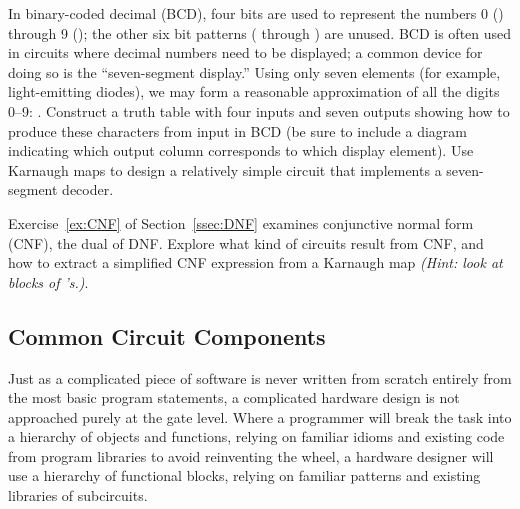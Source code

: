 \begin{exercises}
\problem\label{ex:BCD} In binary-coded decimal (BCD), four bits are used to represent the numbers 0 (\0\0\0\0) through 9 (\1\0\0\1); the other six bit patterns (\1\0\1\0 through \1\1\1\1) are unused. BCD is often used in circuits where decimal numbers need to be displayed; a common device for doing so is the ``seven-segment display.'' Using only seven elements (for example, light-emitting diodes), we may form a reasonable approximation of all the digits 0--9: . Construct a truth table with four inputs and seven outputs showing how to produce these characters from input in BCD (be sure to include a diagram indicating which output column corresponds to which display element). Use Karnaugh maps to design a relatively simple circuit that implements a seven-segment decoder.

\problem Exercise~\ref{ex:CNF} of Section~\ref{ssec:DNF} examines conjunctive normal form (CNF), the dual of DNF. Explore what kind of circuits result from CNF, and how to extract a simplified CNF expression from a Karnaugh map \textit{(Hint: look at blocks of \0's.)}.
\end{exercises}

\subsection{Common Circuit Components}
Just as a complicated piece of software is never written from scratch entirely from the most basic program statements, a complicated hardware design is not approached purely at the gate level. Where a programmer will break the task into a hierarchy of objects and functions, relying on familiar idioms and existing code from program libraries to avoid reinventing the wheel, a hardware designer will use a hierarchy of functional blocks, relying on familiar patterns and existing libraries of subcircuits.

